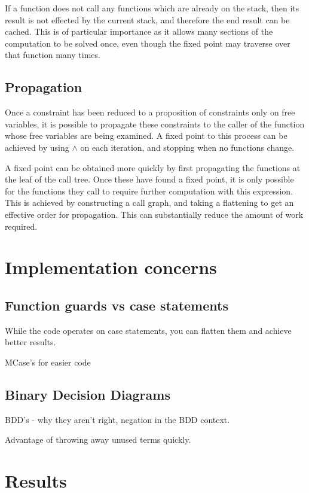 \documentclass[preprint]{sigplanconf}
\begin{document}
If a function does not call any functions which are already on the stack, then
its result is not effected by the current stack, and therefore the end result
can be cached. This is of particular importance as it allows many sections of
the computation to be solved once, even though the fixed point may traverse
over that function many times.

\subsection{Propagation}

Once a constraint has been reduced to a proposition of constraints only on free
variables, it is possible to propagate these constraints to the caller of the
function whose free variables are being examined. A fixed point to this process
can be achieved by using $\wedge$ on each iteration, and stopping when no
functions change.

A fixed point can be obtained more quickly by first propagating the functions
at the leaf of the call tree. Once these have found a fixed point, it is only
possible for the functions they call to require further computation with this
expression. This is achieved by constructing a call graph, and taking a
flattening to get an effective order for propagation. This can substantially
reduce the amount of work required.

\section{Implementation concerns}

\subsection{Function guards vs case statements}

While the code operates on case statements, you can flatten them and achieve
better results.

MCase's for easier code

\subsection{Binary Decision Diagrams}

BDD's - why they aren't right, negation in the BDD context.

Advantage of throwing away unused terms quickly.

\section{Results}
\label{chap:results}
\end{document}

